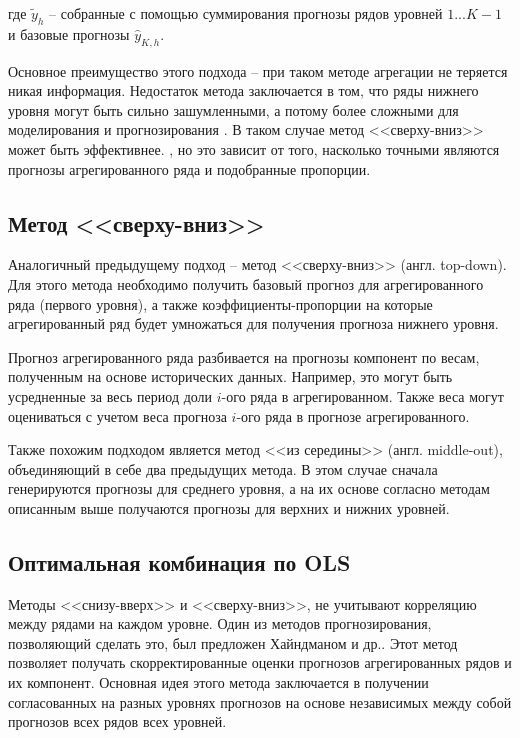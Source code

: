 \documentclass[12pt,a4paper, oneside]{extreport}
\begin{document}
 \noindent
где $\tilde{y}_h$  -- собранные с помощью суммирования прогнозы рядов уровней $1...K-1$  и базовые прогнозы $\hat{y}_{K,h}$. 

Основное преимущество этого подхода -- при таком методе агрегации не теряется никая информация. Недостаток метода заключается в том, что ряды нижнего уровня могут быть сильно зашумленными, а потому   более сложными для моделирования и прогнозирования \cite{weiss2018essays}.
В таком случае метод  <<сверху-вниз>>  может быть эффективнее. , но это зависит от того, насколько точными являются прогнозы агрегированного ряда и подобранные пропорции. 


\subsection{Метод <<сверху-вниз>>}

Аналогичный предыдущему подход --  метод <<сверху-вниз>> (англ. top-down). Для этого метода необходимо получить базовый прогноз для агрегированного ряда (первого уровня), а также коэффициенты-пропорции на которые агрегированный ряд будет умножаться для получения прогноза нижнего уровня.   



Прогноз   агрегированного  ряда разбивается на прогнозы компонент по весам, полученным  на основе исторических данных. Например,  это могут быть усредненные  за весь период доли  $i$-ого  ряда в агрегированном. 
Также веса могут  оцениваться  с учетом веса прогноза $i$-ого  ряда в прогнозе  агрегированного. 

Также похожим  подходом является метод <<из середины>>  (англ. middle-out), объединяющий в себе два предыдущих метода. В этом случае сначала генерируются прогнозы для среднего уровня, а на их основе согласно методам описанным выше получаются прогнозы для верхних и нижних уровней. 


\subsection{Оптимальная комбинация по OLS  }


Методы  <<снизу-вверх>> и <<сверху-вниз>>,  не учитывают  корреляцию между  рядами на каждом уровне.  
Один из методов прогнозирования, позволяющий сделать это, был предложен Хайндманом и др.\cite{hyndman2011optimal}. 
Этот метод позволяет получать скорректированные  оценки  прогнозов агрегированных рядов и их компонент. Основная идея этого метода заключается в получении согласованных  на разных уровнях прогнозов на основе независимых между собой прогнозов всех рядов всех уровней. 
\end{document}
